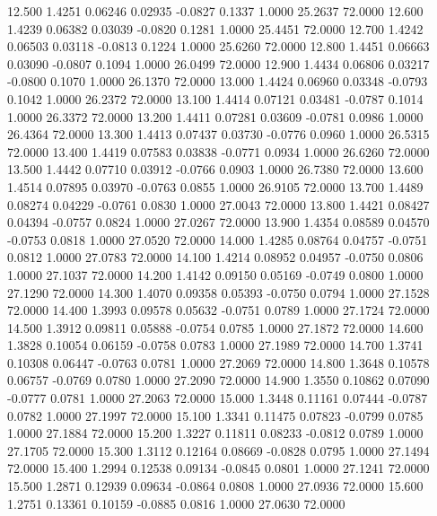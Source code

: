   12.500   1.4251   0.06246   0.02935  -0.0827   0.1337   1.0000  25.2637  72.0000
  12.600   1.4239   0.06382   0.03039  -0.0820   0.1281   1.0000  25.4451  72.0000
  12.700   1.4242   0.06503   0.03118  -0.0813   0.1224   1.0000  25.6260  72.0000
  12.800   1.4451   0.06663   0.03090  -0.0807   0.1094   1.0000  26.0499  72.0000
  12.900   1.4434   0.06806   0.03217  -0.0800   0.1070   1.0000  26.1370  72.0000
  13.000   1.4424   0.06960   0.03348  -0.0793   0.1042   1.0000  26.2372  72.0000
  13.100   1.4414   0.07121   0.03481  -0.0787   0.1014   1.0000  26.3372  72.0000
  13.200   1.4411   0.07281   0.03609  -0.0781   0.0986   1.0000  26.4364  72.0000
  13.300   1.4413   0.07437   0.03730  -0.0776   0.0960   1.0000  26.5315  72.0000
  13.400   1.4419   0.07583   0.03838  -0.0771   0.0934   1.0000  26.6260  72.0000
  13.500   1.4442   0.07710   0.03912  -0.0766   0.0903   1.0000  26.7380  72.0000
  13.600   1.4514   0.07895   0.03970  -0.0763   0.0855   1.0000  26.9105  72.0000
  13.700   1.4489   0.08274   0.04229  -0.0761   0.0830   1.0000  27.0043  72.0000
  13.800   1.4421   0.08427   0.04394  -0.0757   0.0824   1.0000  27.0267  72.0000
  13.900   1.4354   0.08589   0.04570  -0.0753   0.0818   1.0000  27.0520  72.0000
  14.000   1.4285   0.08764   0.04757  -0.0751   0.0812   1.0000  27.0783  72.0000
  14.100   1.4214   0.08952   0.04957  -0.0750   0.0806   1.0000  27.1037  72.0000
  14.200   1.4142   0.09150   0.05169  -0.0749   0.0800   1.0000  27.1290  72.0000
  14.300   1.4070   0.09358   0.05393  -0.0750   0.0794   1.0000  27.1528  72.0000
  14.400   1.3993   0.09578   0.05632  -0.0751   0.0789   1.0000  27.1724  72.0000
  14.500   1.3912   0.09811   0.05888  -0.0754   0.0785   1.0000  27.1872  72.0000
  14.600   1.3828   0.10054   0.06159  -0.0758   0.0783   1.0000  27.1989  72.0000
  14.700   1.3741   0.10308   0.06447  -0.0763   0.0781   1.0000  27.2069  72.0000
  14.800   1.3648   0.10578   0.06757  -0.0769   0.0780   1.0000  27.2090  72.0000
  14.900   1.3550   0.10862   0.07090  -0.0777   0.0781   1.0000  27.2063  72.0000
  15.000   1.3448   0.11161   0.07444  -0.0787   0.0782   1.0000  27.1997  72.0000
  15.100   1.3341   0.11475   0.07823  -0.0799   0.0785   1.0000  27.1884  72.0000
  15.200   1.3227   0.11811   0.08233  -0.0812   0.0789   1.0000  27.1705  72.0000
  15.300   1.3112   0.12164   0.08669  -0.0828   0.0795   1.0000  27.1494  72.0000
  15.400   1.2994   0.12538   0.09134  -0.0845   0.0801   1.0000  27.1241  72.0000
  15.500   1.2871   0.12939   0.09634  -0.0864   0.0808   1.0000  27.0936  72.0000
  15.600   1.2751   0.13361   0.10159  -0.0885   0.0816   1.0000  27.0630  72.0000
